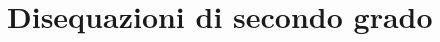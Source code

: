 


%
%   

%

\begin{comment}

\begin{inaccessibleblock}[]
\begin{center}
  \
\end{center}
\end{inaccessibleblock}
\end{comment}

\begin{comment}

\begin{minipage}{.45\textwidth}
\end{minipage}
\begin{minipage}{.25\textwidth}
\end{minipage}
\begin{minipage}{.3\textwidth}
\end{minipage}

\end{comment}

\chapter{Disequazioni di secondo grado} %

